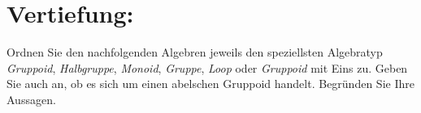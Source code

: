 



    \maketitle
    \section*{Vertiefung:}
    Ordnen Sie den nachfolgenden Algebren jeweils den speziellsten Algebratyp \textsl{Gruppoid}, \textsl{Halbgruppe},
    \textsl{Monoid}, \textsl{Gruppe}, \textsl{Loop} oder \textsl{Gruppoid} mit Eins zu. Geben Sie auch an, ob es sich um
    einen abelschen Gruppoid handelt.
    Begründen Sie Ihre Aussagen.
